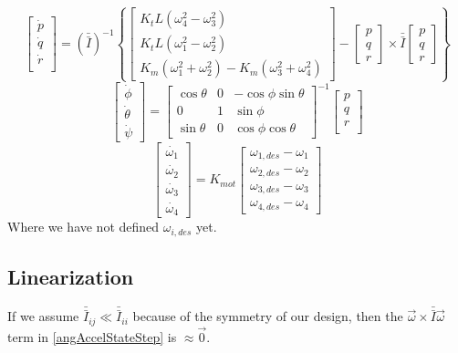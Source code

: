 \documentclass{article}
\numberwithin{equation}{section}
\newcommand{\omegaVec}{
\left[ \begin{array}{ccc}
p\\
q\\
r \end{array} \right]
}
\begin{document}
\begin{equation}
\label{angAccelStateStep}
\left[\begin{array}{c}\dot{p}\\
			       \dot{q}\\
			       \dot{r} \\ \end{array} \right]
			       =
 	 \left(\bar{\bar{I}}\right)^{-1}\left\{
	  \left[ \begin{array}{ccc} K_{t}L\left(\omega_4^2 - \omega_3^2\right) \\ 
  				      K_{t}L\left(\omega_1^2 - \omega_2^2\right) \\ 
				      K_{m}\left(\omega_1^2 + \omega_2^2\right) - K_{m}\left(\omega_3^2 +\omega_4^2\right) \end{array} \right]
				      -
				      \omegaVec \times \bar{\bar{I}} \omegaVec \right\}
\end{equation}
\begin{equation}
\label{eulerDotStateStep}
\left[\begin{array}{c}\dot{\phi}\\
				\dot{\theta} \\
				\dot{\psi} \end{array} \right]
				=
		\left[ \begin{array}{ccc} \cos{\theta} & 0 & -\cos{\phi}\sin{\theta} \\
						     0 & 1 & \sin{\phi} \\
						     \sin{\theta} & 0 & \cos{\phi}\cos{\theta} \end{array} \right]^{-1}
		\left[\begin{array}{c}p\\
			       q\\
			       r \\ \end{array} \right]
\end{equation}
\begin{equation}
\label{omegaDotStateStep}
\left[\begin{array}{c} \dot{\omega_1} \\
				\dot{\omega_2} \\
				\dot{\omega_3} \\
				\dot{\omega_4} \end{array} \right]
				=
	K_{mot}\left[\begin{array}{c} \omega_{1,des} - \omega_1 \\
						   \omega_{2,des} - \omega_2 \\
						   \omega_{3,des} - \omega_3 \\
						   \omega_{4,des} - \omega_4 \end{array} \right]
\end{equation}
Where we have not defined $\omega_{i,des}$ yet.

\subsection{Linearization}
If we assume $\bar{\bar{I}}_{ij} \ll \bar{\bar{I}}_{ii}$ because of the symmetry of our design, then the $\vec{\omega} \times \bar{\bar{I}}\vec{\omega} $ term in \eqref{angAccelStateStep} is $\approx \vec{0}$.  
\end{document}
